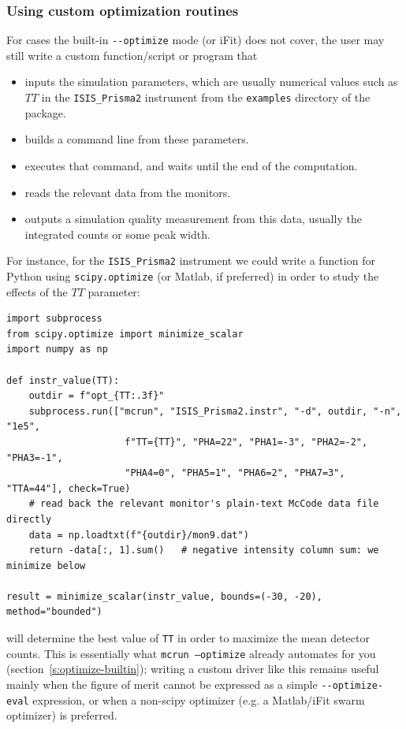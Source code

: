 \subsubsection{Using custom optimization routines}
For cases the built-in \verb+--optimize+ mode (or iFit) does not cover, the
user may still write a custom function/script or program that
\begin{itemize}
\item inputs the simulation parameters, which are usually numerical values such
  as $TT$ in the \verb+ISIS_Prisma2+ instrument from the \verb+examples+ directory of
  the package.
\item builds a command line from these parameters.
\item executes that command, and waits until the end of the computation.
\item reads the relevant data from the monitors.
\item outputs a simulation quality measurement from this data, usually the
  integrated counts or some peak width.
\end{itemize}

For instance, for the \verb+ISIS_Prisma2+ instrument we could write a function for
Python using \texttt{scipy.optimize} (or Matlab, if preferred) in
order to study the effects of the $TT$ parameter:
\begin{lstlisting}
import subprocess
from scipy.optimize import minimize_scalar
import numpy as np

def instr_value(TT):
    outdir = f"opt_{TT:.3f}"
    subprocess.run(["mcrun", "ISIS_Prisma2.instr", "-d", outdir, "-n", "1e5",
                     f"TT={TT}", "PHA=22", "PHA1=-3", "PHA2=-2", "PHA3=-1",
                     "PHA4=0", "PHA5=1", "PHA6=2", "PHA7=3", "TTA=44"], check=True)
    # read back the relevant monitor's plain-text McCode data file directly
    data = np.loadtxt(f"{outdir}/mon9.dat")
    return -data[:, 1].sum()   # negative intensity column sum: we minimize below

result = minimize_scalar(instr_value, bounds=(-30, -20), method="bounded")
\end{lstlisting}
will determine the best value of \texttt{TT} in order to maximize the mean
detector counts. This is essentially what \texttt{mcrun --optimize} already
automates for you (section~\ref{s:optimize-builtin}); writing a custom driver
like this remains useful mainly when the figure of merit cannot be expressed
as a simple \verb+--optimize-eval+ expression, or when a non-scipy optimizer
(e.g. a Matlab/iFit swarm optimizer) is preferred.

